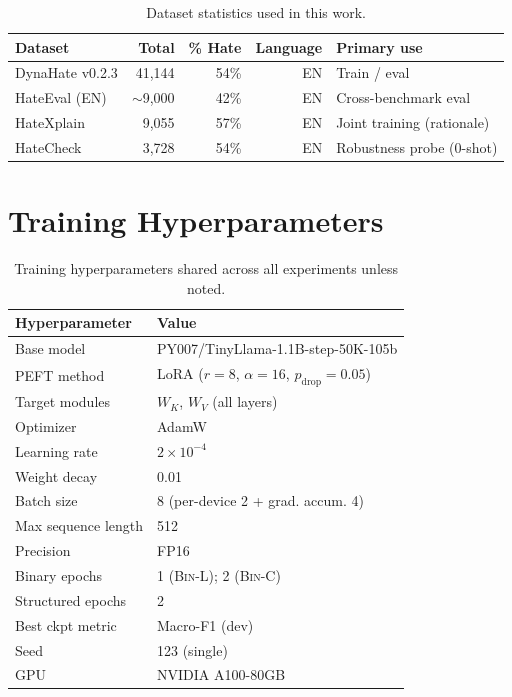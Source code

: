 \documentclass{article}
\begin{document}
\begin{table}[h]
\centering
\caption{Dataset statistics used in this work.}
\label{tab:datasets}
\small
\begin{tabular}{lrrrl}
\toprule
Dataset & Total & \% Hate & Language & Primary use \\
\midrule
DynaHate v0.2.3 & 41,144 & 54\% & EN & Train / eval \\
HateEval (EN) & $\sim$9,000 & 42\% & EN & Cross-benchmark eval \\
HateXplain & 9,055 & 57\% & EN & Joint training (rationale) \\
HateCheck & 3,728 & 54\% & EN & Robustness probe (0-shot) \\
\bottomrule
\end{tabular}
\end{table}

\section{Training Hyperparameters}
\label{app:hyperparams}

\begin{table}[h]
\centering
\caption{Training hyperparameters shared across all experiments unless noted.}
\label{tab:hyperparams}
\small
\begin{tabular}{ll}
\toprule
Hyperparameter & Value \\
\midrule
Base model & PY007/TinyLlama-1.1B-step-50K-105b \\
PEFT method & LoRA ($r=8$, $\alpha=16$, $p_\text{drop}=0.05$) \\
Target modules & $W_K$, $W_V$ (all layers) \\
Optimizer & AdamW \\
Learning rate & $2\times10^{-4}$ \\
Weight decay & 0.01 \\
Batch size & 8 (per-device 2 + grad. accum. 4) \\
Max sequence length & 512 \\
Precision & FP16 \\
Binary epochs & 1 (\textsc{Bin-L}); 2 (\textsc{Bin-C}) \\
Structured epochs & 2 \\
Best ckpt metric & Macro-F1 (dev) \\
Seed & 123 (single) \\
GPU & NVIDIA A100-80GB \\
\bottomrule
\end{tabular}
\end{table}
\end{document}
